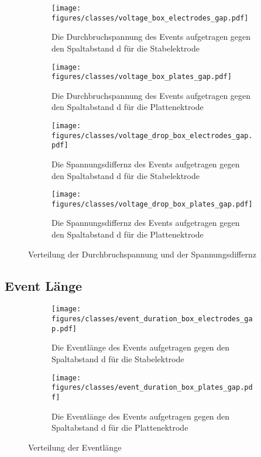 \begin{figure}[H]
  \centering
  \begin{subfigure}[t]{0.48\textwidth}
    \centering
    \texttt{[image: figures/classes/voltage\_box\_electrodes\_gap.pdf]}
    \caption{Die Durchbruchspannung des Events aufgetragen gegen den Spaltabstand d für die Stabelektrode}
    \label{fig:box-gap-event-voltage-stab}
  \end{subfigure}
  \begin{subfigure}[t]{0.48\textwidth}
    \centering
    \texttt{[image: figures/classes/voltage\_box\_plates\_gap.pdf]}
    \caption{Die Durchbruchspannung des Events aufgetragen gegen den Spaltabstand d für die Plattenektrode}
    \label{fig:box-gap-event-voltage-plate}
  \end{subfigure}
  \centering
  \begin{subfigure}[t]{0.48\textwidth}
    \centering
    \texttt{[image: figures/classes/voltage\_drop\_box\_electrodes\_gap.pdf]}
    \caption{Die Spannungsdiffernz des Events aufgetragen gegen den Spaltabstand d für die Stabelektrode}
    \label{fig:box-gap-event-voltage-diff-stab}
  \end{subfigure}
  \begin{subfigure}[t]{0.48\textwidth}
    \centering
    \texttt{[image: figures/classes/voltage\_drop\_box\_plates\_gap.pdf]}
    \caption{Die Spannungsdiffernz des Events aufgetragen gegen den Spaltabstand d für die Plattenektrode}
    \label{fig:box-gap-event-voltage-diff-plate}
  \end{subfigure}
  \caption{Verteilung der Durchbruchspannung und der Spannungsdiffernz}
  \label{fig:box-gap-event-voltage-voltage-diff}
\end{figure}


\subsection{Event Länge}

\begin{figure}[H]
  \centering
  \begin{subfigure}[t]{0.48\textwidth}
    \centering
    \texttt{[image: figures/classes/event\_duration\_box\_electrodes\_gap.pdf]}
    \caption{Die Eventlänge des Events aufgetragen gegen den Spaltabstand d für die Stabelektrode}
    \label{fig:box-gap-event-duration-stab}
  \end{subfigure}
  \begin{subfigure}[t]{0.48\textwidth}
    \centering
    \texttt{[image: figures/classes/event\_duration\_box\_plates\_gap.pdf]}
    \caption{Die Eventlänge des Events aufgetragen gegen den Spaltabstand d für die Plattenektrode}
    \label{fig:box-gap-event-duration-plate}
  \end{subfigure}
  \caption{Verteilung der Eventlänge}
  \label{fig:box-gap-event-duration}
\end{figure}














